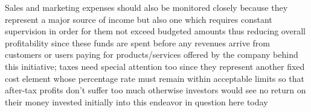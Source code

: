 Sales and marketing expenses should also be monitored closely because they represent a major source of income but also one which requires constant supervision in order for them not exceed budgeted amounts thus reducing overall profitability since these funds are spent before any revenues arrive from customers or users paying for products/services offered by the company behind this initiative; taxes need special attention too since they represent another fixed cost element whose percentage rate must remain within acceptable limits so that after-tax profits don't suffer too much otherwise investors would see no return on their money invested initially into this endeavor in question here today